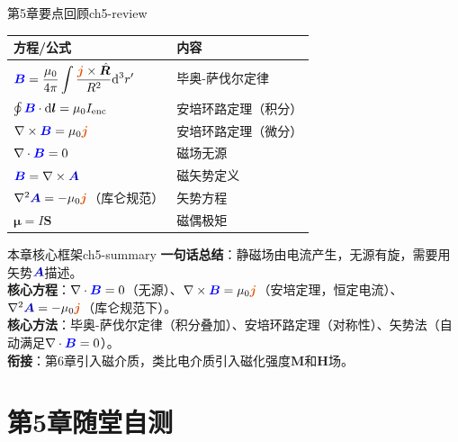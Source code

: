 \documentclass[11pt,a4paper,openany,oneside]{book}
\newcommand{\diff}{\mathrm{d}}
\newcommand{\vecB}{\textcolor{blue}{\vect{B}}}
\newcommand{\vecJ}{\textcolor{cororange}{\vect{j}}}
\newcommand{\vecA}{\textcolor{blue!70!black}{\vect{A}}}
\newcommand{\muz}{\mu_0}
\newcommand{\vect}[1]{\bm{#1}}
\newcommand{\unitvec}[1]{\hat{\vect{#1}}}
\newcommand{\curl}{\nabla\times}
\newcommand{\divg}{\nabla\cdot}
\newcommand{\lap}{\nabla^2}
\begin{document}
\begin{review}{第5章要点回顾}{ch5-review}
\begin{center}
\begin{tabular}{@{}ll@{}}
\toprule
\textbf{方程/公式} & \textbf{内容} \\
\midrule
$\vecB = \dfrac{\muz}{4\pi}\displaystyle\int\dfrac{\vecJ\times\unitvec{R}}{R^2}\diff^3r'$ & 毕奥-萨伐尔定律 \\
$\oint\vecB\cdot\diff\vect{l} = \muz I_{\text{enc}}$ & 安培环路定理（积分） \\
$\curl\vecB = \muz\vecJ$ & 安培环路定理（微分） \\
$\divg\vecB = 0$ & 磁场无源 \\
$\vecB = \curl\vecA$ & 磁矢势定义 \\
$\lap\vecA = -\muz\vecJ$（库仑规范） & 矢势方程 \\
$\vect{\mu} = I\vect{S}$ & 磁偶极矩 \\
\bottomrule
\end{tabular}
\end{center}
\end{review}

\begin{tip}{本章核心框架}{ch5-summary}
\textbf{一句话总结}：静磁场由电流产生，无源有旋，需要用矢势$\vecA$描述。\\
\textbf{核心方程}：$\divg\vecB=0$（无源）、$\curl\vecB=\mu_0\vecJ$（安培定理，恒定电流）、$\lap\vecA=-\mu_0\vecJ$（库仑规范下）。\\
\textbf{核心方法}：毕奥-萨伐尔定律（积分叠加）、安培环路定理（对称性）、矢势法（自动满足$\divg\vecB=0$）。\\
\textbf{衔接}：第6章引入磁介质，类比电介质引入磁化强度$\vect{M}$和$\vect{H}$场。
\end{tip}

\section*{第5章随堂自测}
\end{document}
